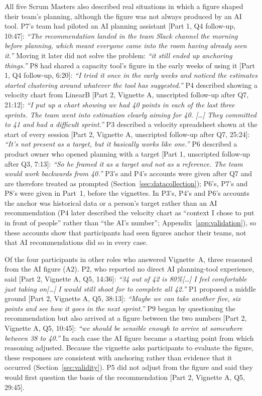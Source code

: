 \documentclass[a4paper,twoside]{bth}
\begin{document}
All five Scrum Masters also described real situations in which a figure shaped their team's planning, although the figure was not always produced by an AI tool. P7's team had piloted an AI planning assistant [Part 1, Q4 follow-up, 10:47]: \textit{``The recommendation landed in the team Slack channel the morning before planning, which meant everyone came into the room having already seen it.''} Moving it later did not solve the problem: \textit{``it still ended up anchoring things.''} P8 had shared a capacity tool's figure in the early weeks of using it [Part 1, Q4 follow-up, 6:20]: \textit{``I tried it once in the early weeks and noticed the estimates started clustering around whatever the tool has suggested.''} P4 described showing a velocity chart from LinearB [Part 2, Vignette A, unscripted follow-up after Q7, 21:12]: \textit{``I put up a chart showing we had 40 points in each of the last three sprints. The team went into estimation clearly aiming for 40. {[}\ldots{]} They committed to 41 and had a difficult sprint.''} P3 described a velocity spreadsheet shown at the start of every session [Part 2, Vignette A, unscripted follow-up after Q7, 25:24]: \textit{``It's not present as a target, but it basically works like one.''} P6 described a product owner who opened planning with a target [Part 1, unscripted follow-up after Q3, 7:13]: \textit{``So he framed it as a target and not as a reference. The team would work backwards from 40.''} P3's and P4's accounts were given after Q7 and are therefore treated as prompted (Section~\ref{sec:datacollection}); P6's, P7's and P8's were given in Part~1, before the vignettes. In P3's, P4's and P6's accounts the anchor was historical data or a person's target rather than an AI recommendation (P4 later described the velocity chart as ``context I chose to put in front of people'' rather than ``the AI's number''; Appendix~\ref{app:validation}), so these accounts show that participants had seen figures anchor their teams, not that AI recommendations did so in every case.

Of the four participants in other roles who answered Vignette~A, three reasoned from the AI figure (A2). P2, who reported no direct AI planning-tool experience, said [Part 2, Vignette A, Q5, 14:36]: \textit{``34 out of 42 is 80\%{[}\ldots{]} I feel comfortable just taking on{[}\ldots{]} I would still shoot for to complete all 42.''} P1 proposed a middle ground [Part 2, Vignette A, Q5, 38:13]: \textit{``Maybe we can take another five, six points and see how it goes in the next sprint.''} P9 began by questioning the recommendation but also arrived at a figure between the two numbers [Part 2, Vignette A, Q5, 10:45]: \textit{``we should be sensible enough to arrive at somewhere between 38 to 40.''} In each case the AI figure became a starting point from which reasoning adjusted. Because the vignette asks participants to evaluate the figure, these responses are consistent with anchoring rather than evidence that it occurred (Section~\ref{sec:validity}). P5 did not adjust from the figure and said they would first question the basis of the recommendation [Part 2, Vignette A, Q5, 29:45].
\end{document}
